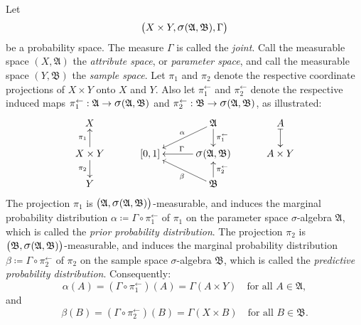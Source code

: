 \documentclass[
twoside=true,
paper=letter,
fontsize=11pt,
pagesize=auto,
leqno,
openany,
headsepline,
overfullrule,
]{scrbook}
\theoremstyle{plain}
\theoremstyle{plain}
\theoremstyle{definition}
\theoremstyle{bfnoteitalic}
\theoremstyle{bfnoteroman}
\newcommand{\sigalg}[1]{\mathfrak{#1}}
\newcommand{\definedby}{\coloneqq}
\newcommand{\sagb}{\mathop{\hbox{\large{$\sigma$}}}\nolimits}
\newcommand{\textsigma}{\hbox{\large{$\sigma$}}\kern-1pt}
\newcommand{\preimage}[1]{#1^{\leftarrow}}
\newcommand{\productsig}[2]{\sagb(#1,#2)}
\newcommand{\measurespace}{X}
\newcommand{\measurespaceii}{Y}
\newcommand{\seti}{A}
\newcommand{\projectionone}{\pi_1}
\newcommand{\projectiontwo}{\pi_2}
\newcommand{\pspace}{\measurespace}%
\newcommand{\sspace}{\measurespaceii}%
\newcommand{\pspaceset}{A}
\newcommand{\sspaceset}{B}
\newcommand{\sspacesig}{\sigalg{B}}
\newcommand{\pspacesig}{\sigalg{A}}
\newcommand{\measonprod}{\Gamma}%
\newcommand{\marginalone}{\alpha}%
\newcommand{\marginaltwo}{\beta}%
\newcommand{\prior}{\marginalone}
\newcommand{\predictive}{\marginaltwo}
\begin{document}
Let
\[
\bigl(\pspace\times\sspace,
\productsig{\pspacesig}{\sspacesig}, 
\measonprod\bigr)
\]
be a probability space.
The measure $\measonprod$ is called the \emph{joint}.
Call the measurable space $(\pspace, \pspacesig)$ the \emph{attribute space}, or \emph{parameter space}, and call the measurable space
$(\sspace, \sspacesig)$ the 
\emph{sample space}.
Let $\projectionone$ and $\projectiontwo$ denote the respective coordinate projections of 
$\pspace\times\sspace$ onto $\pspace$ and $\sspace$. Also let $\preimage{\projectionone}$ and 
$\preimage{\projectiontwo}$ denote the respective induced maps 
$\preimage{\projectionone}:\pspacesig\to\productsig{\pspacesig}{\sspacesig}$
and 
$\preimage{\projectiontwo}:\sspacesig\to\productsig{\pspacesig}{\sspacesig}$, as illustrated:
\[
\xymatrix@R=16pt@C=30pt{ 
\pspace
&
&
\pspacesig 
\ar[d]^-{\preimage{\projectionone}}
\ar[dl]_-{\marginalone}
& \seti \ar@{|->}[d]
\\
\pspace\times\sspace \ar[u]^-{\projectionone} \ar[d]_-{\projectiontwo} &
[0,1] &
\productsig{\pspacesig}{\sspacesig}  \ar[l]_\measonprod
& \seti\times\sspace
\\
\sspace 
&
&
\sspacesig
\ar[u]_-{\preimage{\projectiontwo}}
\ar[ul]^-{\marginaltwo}
\\
}
\]
The projection $\projectionone$ 
is $\bigl(\pspacesig,\productsig{\pspacesig}{\sspacesig}\bigr)$\hyp{}measurable, and
induces the marginal probability distribution
$\marginalone\definedby\measonprod\circ\preimage{\projectionone}$ of $\projectionone$ on the parameter space
\textsigma-algebra $\pspacesig$, 
which is called the \emph{prior probability distribution}.
The projection $\projectiontwo$ 
is $\bigl(\sspacesig,\productsig{\pspacesig}{\sspacesig}\bigr)$\hyp{}measurable, and 
induces the marginal probability distribution
$\marginaltwo\definedby\measonprod\circ\preimage{\projectiontwo}$ of $\projectiontwo$ on the sample space
\textsigma-algebra $\sspacesig$, 
which is called the \emph{predictive probability distribution}.
Consequently:
\[
\prior(\pspaceset) 
= ( \measonprod\circ\preimage{\projectionone} ) (\pspaceset)
= \measonprod(\pspaceset\times\sspace)
\quad \text{for all $\pspaceset\in\pspacesig$},
\]
and
\[
\predictive(\sspaceset) 
= ( \measonprod\circ\preimage{\projectiontwo} ) (\sspaceset)
= \measonprod(\pspace\times\sspaceset)
\quad \text{for all $\sspaceset\in\sspacesig$}.
\]
\end{document}
